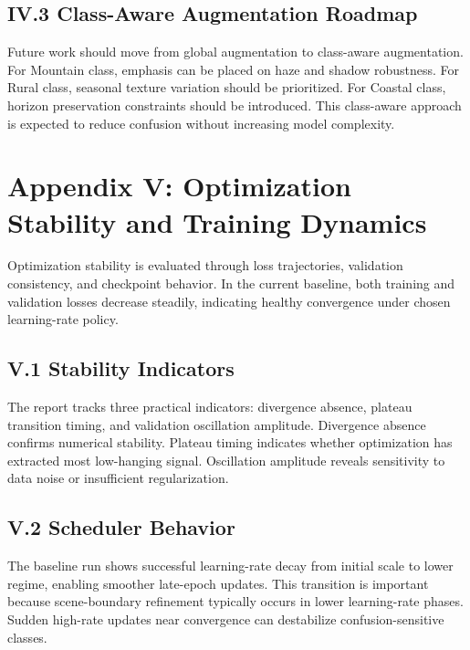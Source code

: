 \subsection*{IV.3 Class-Aware Augmentation Roadmap}
Future work should move from global augmentation to class-aware augmentation. For Mountain class, emphasis can be placed on haze and shadow robustness. For Rural class, seasonal texture variation should be prioritized. For Coastal class, horizon preservation constraints should be introduced. This class-aware approach is expected to reduce confusion without increasing model complexity.

\section*{Appendix V: Optimization Stability and Training Dynamics}

Optimization stability is evaluated through loss trajectories, validation consistency, and checkpoint behavior. In the current baseline, both training and validation losses decrease steadily, indicating healthy convergence under chosen learning-rate policy.

\subsection*{V.1 Stability Indicators}
The report tracks three practical indicators: divergence absence, plateau transition timing, and validation oscillation amplitude. Divergence absence confirms numerical stability. Plateau timing indicates whether optimization has extracted most low-hanging signal. Oscillation amplitude reveals sensitivity to data noise or insufficient regularization.

\subsection*{V.2 Scheduler Behavior}
The baseline run shows successful learning-rate decay from initial scale to lower regime, enabling smoother late-epoch updates. This transition is important because scene-boundary refinement typically occurs in lower learning-rate phases. Sudden high-rate updates near convergence can destabilize confusion-sensitive classes.

